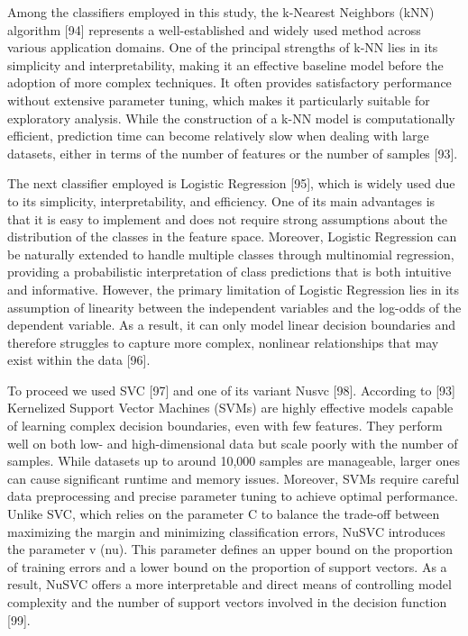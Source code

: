 \documentclass{article}
\begin{document}
Among the classifiers employed in this study, the k-Nearest Neighbors (kNN) algorithm [94] represents a well-established and widely used method across various application domains.
One of the principal strengths of k-NN lies in its simplicity and interpretability, making it an effective baseline model before the adoption of more complex techniques.
It often provides satisfactory performance without extensive parameter tuning, which makes it particularly suitable for exploratory analysis.
While the construction of a k-NN model is computationally efficient, prediction time can become relatively slow when dealing with large datasets, either in terms of the number of features or the number of samples [93].

The next classifier employed is Logistic Regression [95], which is widely used due to its simplicity, interpretability, and efficiency. 
One of its main advantages is that it is easy to implement and does not require strong assumptions about the distribution of the classes in the feature space. 
Moreover, Logistic Regression can be naturally extended to handle multiple classes through multinomial regression, providing a probabilistic interpretation of class predictions that is both intuitive and informative.
However, the primary limitation of Logistic Regression lies in its assumption of linearity between the independent variables and the log-odds of the dependent variable. 
As a result, it can only model linear decision boundaries and therefore struggles to capture more complex, nonlinear relationships that may exist within the data [96].

To proceed we used SVC [97] and one of its variant Nusvc [98].
According to [93] Kernelized Support Vector Machines (SVMs) are highly effective models capable of learning complex decision boundaries, even with few features. 
They perform well on both low- and high-dimensional data but scale poorly with the number of samples. 
While datasets up to around 10,000 samples are manageable, larger ones can cause significant runtime and memory issues. 
Moreover, SVMs require careful data preprocessing and precise parameter tuning to achieve optimal performance.
Unlike SVC, which relies on the parameter C to balance the trade-off between maximizing the margin and minimizing classification errors, NuSVC introduces the parameter v (nu).
This parameter defines an upper bound on the proportion of training errors and a lower bound on the proportion of support vectors. 
As a result, NuSVC offers a more interpretable and direct means of controlling model complexity and the number of support vectors involved in the decision function [99].
\end{document}
